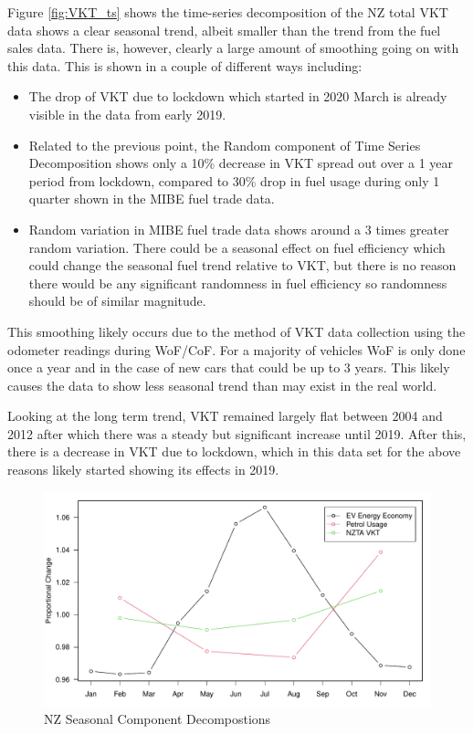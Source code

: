 \documentclass[
]{article}
\begin{document}
Figure \ref{fig:VKT_ts} shows the time-series decomposition of the NZ
total VKT data shows a clear seasonal trend, albeit smaller than the
trend from the fuel sales data. There is, however, clearly a large
amount of smoothing going on with this data. This is shown in a couple
of different ways including:

\begin{itemize}
\item The drop of VKT due to lockdown which started in 2020 March is already visible in the data from early 2019. 
\item Related to the previous point, the Random component of Time Series Decomposition shows only a 10\% decrease in VKT spread out over a 1 year period from lockdown, compared to 30\% drop in fuel usage during only 1 quarter shown in the MIBE fuel trade data. 
\item Random variation in MIBE fuel trade data shows around a 3 times greater random variation. There could be a seasonal effect on fuel efficiency which could change the seasonal fuel trend relative to VKT, but there is no reason there would be any significant randomness in fuel efficiency so randomness should be of similar magnitude.
\end{itemize}

This smoothing likely occurs due to the method of VKT data collection
using the odometer readings during WoF/CoF. For a majority of vehicles
WoF is only done once a year and in the case of new cars that could be
up to 3 years. This likely causes the data to show less seasonal trend
than may exist in the real world.

Looking at the long term trend, VKT remained largely flat between 2004
and 2012 after which there was a steady but significant increase until
2019. After this, there is a decrease in VKT due to lockdown, which in
this data set for the above reasons likely started showing its effects
in 2019.

\begin{figure}
\centering
\includegraphics{final_report_files/figure-latex/petrol_VKT_vs_eff-1.pdf}
\caption{NZ Seasonal Component Decompostions}
\end{figure}
\end{document}
